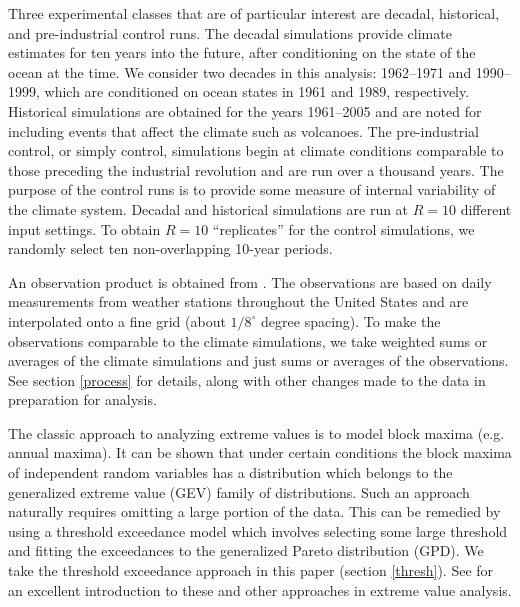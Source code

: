 Three experimental classes that are of particular interest are decadal, historical, and pre-industrial control runs. The decadal simulations provide climate estimates for ten years into the future, after conditioning on the state of the ocean at the time. We consider two decades in this analysis: 1962--1971 and 1990--1999, which are conditioned on ocean states in 1961 and 1989, respectively. Historical simulations are obtained for the years 1961--2005 and are noted for including events that affect the climate such as volcanoes. The pre-industrial control, or simply control, simulations begin at climate conditions comparable to those preceding the industrial revolution and are run over a thousand years. The purpose of the control runs is to provide some measure of internal variability of the climate system. Decadal and historical simulations are run at $R=10$ different input settings. To obtain $R=10$ ``replicates'' for the control simulations, we randomly select ten non-overlapping 10-year periods.

An observation product is obtained from \cite{maurer2002long}. The observations are based on daily measurements from weather stations throughout the United States and are interpolated onto a fine grid (about $1/8^\circ$ degree spacing). To make the observations comparable to the climate simulations, we take weighted sums or averages of the climate simulations and just sums or averages of the observations. See section \ref{process} for details, along with other changes made to the data in preparation for analysis.

The classic approach to analyzing extreme values is to model block maxima (e.g. annual maxima). It can be shown that under certain conditions the block maxima of independent random variables has a distribution which belongs to the generalized extreme value (GEV) family of distributions. Such an approach naturally requires omitting a large portion of the data. This can be remedied by using a threshold exceedance model which involves selecting some large threshold and fitting the exceedances to the generalized Pareto distribution (GPD). We take the threshold exceedance approach in this paper (section \ref{thresh}). See \cite{coles2001introduction} for an excellent introduction to these and other approaches in extreme value analysis.


